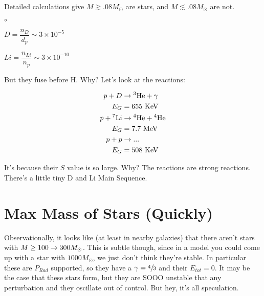 Detailed calculations give $M \gtrsim .08 M_\odot$ are stars, and $M \lesssim .08 M_\odot$ are not. 

%
%

\begin{list}{$\circ$}{}
\item $D= \dfrac{n_D}{d_p} \sim 3 \times 10^{-5}$
\item $Li = \dfrac{n_{Li}}{n_p} \sim 3 \times 10^{-10}$
\end{list}

But they fuse before H. Why? Let's look at the reactions:

\begin{align}
p + D &\rightarrow \textrm{$^{3}$He} + \gamma\\
E_G &= 655 \text{ KeV}\\
p + \textrm{$^{7}$Li} & \rightarrow \textrm{$^{4}$He} + \textrm{$^{4}$He}\\
E_G &= 7.7 \text{ MeV}\\
p + p &\rightarrow ...\\
E_G &= 508 \text{ KeV}
\end{align}

It's because their $S$ value is so large. Why? The reactions are strong reactions. There's a little tiny D and Li Main Sequence. 

\section{Max Mass of Stars (Quickly)}

Observationally, it looks like (at least in nearby galaxies) that there aren't stars with $M \geq 100 \rightarrow 300M_\odot$. This is subtle though, since in a model you could come up with a star with $1000 M_\odot$, we just don't think they're stable. In particular these are $P_{Rad}$ supported, so they have a $\gamma = \sfrac{4}{3}$ and their $E_{tot} = 0$. It may be the case that these stars form, but they are SOOO unstable that any perturbation and they oscillate out of control. But hey, it's all speculation. 
